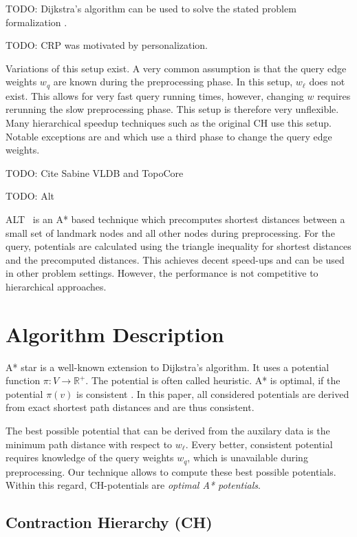 \documentclass[sigconf]{acmart}
\begin{document}
TODO: Dijkstra's algorithm \cite{d-ntpcg-59} can be used to solve the stated problem formalization \cite{Veit?}.

TODO: CRP was motivated by personalization.

Variations of this setup exist.
A very common assumption is that the query edge weights $w_q$ are known during the preprocessing phase.
In this setup, $w_\ell$ does not exist.
This allows for very fast query running times, however, changing $w$ requires rerunning the slow preprocessing phase.
This setup is therefore very unflexible.
Many hierarchical speedup techniques such as the original CH \cite{gssv-erlrn-12} use this setup.
Notable exceptions are \cite{dgpw-crprn-13} and \cite{dsw-cch-15} which use a third phase to change the query edge weights.


TODO: Cite Sabine VLDB and TopoCore

TODO: Alt

ALT~\cite{gh-cspas-05} is an A* based technique which precomputes shortest distances between a small set of landmark nodes and all other nodes during preprocessing.
For the query, potentials are calculated using the triangle inequality for shortest distances and the precomputed distances.
This achieves decent speed-ups and can be used in other problem settings.
However, the performance is not competitive to hierarchical approaches.

\section{Algorithm Description}

A* star is a well-known extension to Dijkstra's algorithm.
It uses a potential function $\pi:V\rightarrow \mathbb{R}^+$.
The potential is often called heuristic.
A* is optimal, if the potential $\pi(v)$ is consistent \cite{p-hissc-84}.
In this paper, all considered potentials are derived from exact shortest path distances and are thus consistent.


The best possible potential that can be derived from the auxilary data is the minimum path distance with respect to $w_\ell$.
Every better, consistent potential requires knowledge of the query weights $w_q$, which is unavailable during preprocessing.
Our technique allows to compute these best possible potentials.
Within this regard, CH-potentials are \emph{optimal A* potentials}.

\subsection{Contraction Hierarchy (CH)}
\end{document}
